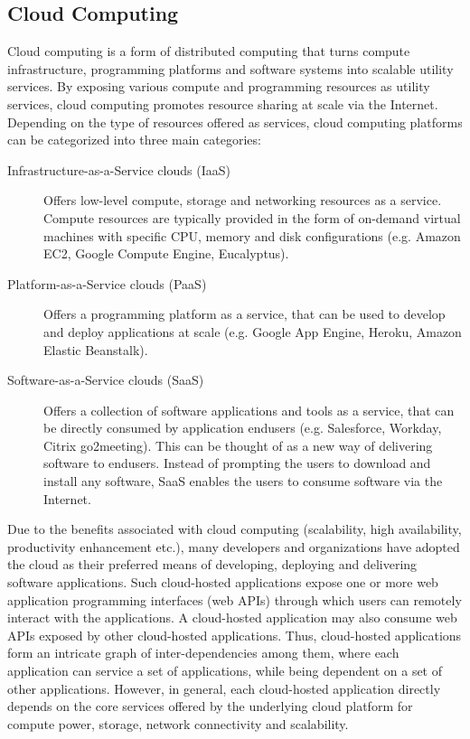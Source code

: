 \subsection{Cloud Computing}

Cloud computing is a form of distributed computing that turns compute infrastructure, programming
platforms and software systems into scalable utility services. By exposing various compute and programming
resources as utility services, cloud computing promotes resource sharing at scale via the Internet.
Depending on the type of resources
offered as services, cloud computing platforms can be categorized into three main categories:

\begin{description}
\item [Infrastructure-as-a-Service clouds (IaaS)]
Offers low-level compute, storage and networking
resources as a service. Compute resources are typically provided in the form of on-demand virtual machines 
with specific CPU, memory and disk configurations (e.g. Amazon EC2, Google Compute Engine, Eucalyptus). 
\item [Platform-as-a-Service clouds (PaaS)]
Offers a programming platform as a service, that can be used to develop and deploy applications at scale 
(e.g. Google App Engine, Heroku, Amazon Elastic Beanstalk).
\item [Software-as-a-Service clouds (SaaS)]
Offers a collection of software applications and tools as a service, that can be directly consumed by
application endusers (e.g. Salesforce, Workday, Citrix go2meeting). This can be thought of as a new way 
of delivering software to
endusers. Instead of prompting the users to download and install any software, SaaS enables the users
to consume software via the Internet.  
\end{description}

Due to the benefits associated with cloud computing (scalability, high availability, productivity enhancement etc.),
many developers and organizations have adopted the cloud as their preferred means of developing, deploying and
delivering software applications. Such cloud-hosted applications expose one or more web application programming 
interfaces (web APIs) through which users can remotely interact with the applications. A cloud-hosted 
application may
also consume web APIs exposed by other cloud-hosted applications. Thus, cloud-hosted applications
form an intricate graph of inter-dependencies among them, where each application can service a set of
applications, while being dependent on a set of other applications. However, in general, each cloud-hosted
application directly depends on the core services offered by the underlying cloud platform for compute power, storage,
network connectivity and scalability.

